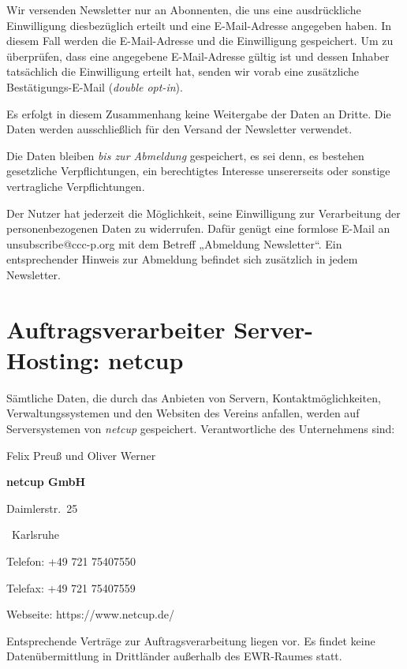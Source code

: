 \documentclass[a4paper, 10pt, headings=normal]{scrartcl}
\begin{document}
\begin{multicols*}{2}
Wir versenden Newsletter nur an Abonnenten, die uns eine ausdrückliche Einwilligung diesbezüglich erteilt und eine E-Mail-Adresse angegeben haben.
In diesem Fall werden die E-Mail-Adresse und die Einwilligung gespeichert.
Um zu überprüfen, dass eine angegebene E-Mail-Adresse gültig ist und dessen Inhaber tatsächlich die Einwilligung erteilt hat, senden wir vorab eine zusätzliche Bestätigungs-E-Mail (\emph{double opt-in}).

Es erfolgt in diesem Zusammenhang keine Weitergabe der Daten an Dritte.
Die Daten werden ausschließlich für den Versand der Newsletter verwendet.

Die Daten bleiben \emph{bis zur Abmeldung} gespeichert, es sei denn, es bestehen gesetzliche Verpflichtungen, ein berechtigtes Interesse unsererseits oder sonstige vertragliche Verpflichtungen.

Der Nutzer hat jederzeit die Möglichkeit, seine Einwilligung zur Verarbeitung der personenbezogenen Daten zu widerrufen.
Dafür genügt eine formlose E-Mail an \textcolor{alert}{unsubscribe@ccc-p.org} mit dem Betreff „Abmeldung Newsletter“. Ein entsprechender Hinweis zur Abmeldung befindet sich zusätzlich in jedem Newsletter.

\section{Auftragsverarbeiter Server-Hosting: netcup}

Sämtliche Daten, die durch das Anbieten von Servern, Kontaktmöglichkeiten, Verwaltungssystemen und den Websiten des Vereins anfallen, werden auf Serversystemen von \emph{netcup} gespeichert.
Verantwortliche des Unternehmens sind:\strut%

\begin{address}\strut%
	\noindent Felix Preuß und Oliver Werner

	\noindent \textbf{netcup GmbH}

	\noindent Daimlerstr.~25

	~Karlsruhe

	\medskip

	\noindent Telefon: +49 721 75407550

	\noindent Telefax: +49 721 75407559

	\noindent Webseite: https://www.netcup.de/\strut
\end{address}

Entsprechende Verträge zur Auftragsverarbeitung liegen vor.
Es findet keine Datenübermittlung in Drittländer außerhalb des EWR-Raumes statt.


\end{multicols*}
\end{document}

